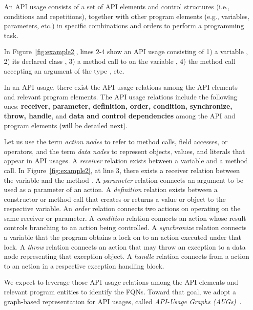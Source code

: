 \begin{Definition}
An API usage consists of a set of API elements and control structures
(i.e., conditions and repetitions), together with other program
elements (e.g., variables, parameters, etc.) in specific combinations
and orders to perform a programming task.
\end{Definition}

In Figure~\ref{fig:example2}, lines 2-4 show an API usage consisting
of 1) a variable , 2) its declared class ,
3) a method call to  on the variable
, 4) the method call  accepting an
argument of the type , etc.

\begin{Definition}
  In an API usage, there exist the API usage relations among the API
  elements and relevant program elements. The API usage relations
  include the following ones: {\bf receiver, parameter, definition,
    order, condition, synchronize, throw, handle}, and {\bf data and
    control dependencies} among the API and program elements (will be
  detailed next).
\end{Definition}

Let us use the term {\em action nodes} to refer to method calls, field
accesses, or operators, and the term {\em data nodes} to represent
objects, values, and literals that appear in API usages. A {\em
  receiver} relation exists between a variable and a method call. In
Figure~\ref{fig:example2}, at line 3, there exists a receiver relation
between the variable  and the method
. A {\em parameter} relation connects an
argument to be used as a parameter of an action. A {\em definition}
relation exists between a constructor or method call that creates or
returns a value or object to the respective variable. An {\em order}
relation connects two actions on operating on the same receiver or
parameter. A {\em condition} relation connects an action whose result
controls branching to an action being controlled. A {\em synchronize}
relation connects a variable that the program obtains a lock on to an
action executed under that lock. A {\em throw} relation connects an
action that may throw an exception to a data node representing that
exception object. A {\em handle} relation connects from a 
action to an action in a respective exception handling block.

We expect to leverage those API usage relations among the API elements
and relevant program entities to identify the FQNs. Toward that goal,
we adopt a graph-based representation for API usages, called {\em
  API-Usage Graphs (AUGs)}~\cite{msr19}.

